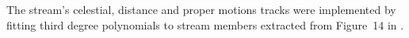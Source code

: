 The stream's celestial, distance and proper motions tracks were implemented by fitting third degree polynomials to stream members extracted from Figure~14 in \citet{Ibata2021}. 
